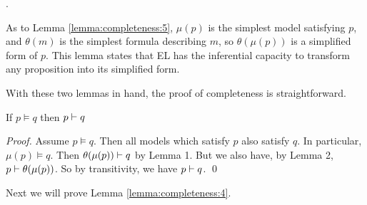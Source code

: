 .

As to Lemma \ref{lemma:completeness:5}, $\mu(p)$ is the simplest model
satisfying $p$, and $\theta(m)$ is the simplest formula describing
$m$, so $\theta(\mu(p))$ is a simplified form of $p$. This lemma
states that EL has the inferential capacity to transform any
proposition into its simplified form.

With these two lemmas in hand, the proof of completeness is
straightforward.

\begin{theorem}
If $p \models q$ then $p \vdash q$
\end{theorem}
\begin{proof}
Assume $p \models q$. 
Then all models which satisfy $p$ also satisfy $q$.
In particular, $\mu(p) \models q$.
Then $\theta(\mu(p)) \vdash q$ by Lemma 1.
But we also have, by Lemma 2, $p \vdash \theta(\mu(p)) $.
So by transitivity, we have $p \vdash q$.
\qed
\end{proof}
Next we will prove Lemma \ref{lemma:completeness:4}.
